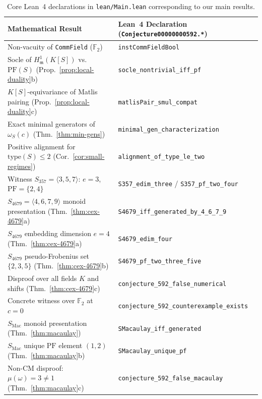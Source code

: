 \documentclass[11pt]{article}
\theoremstyle{definition}
\theoremstyle{remark}
\begin{document}
\begin{table}[ht]
\centering
\caption{Core Lean~4 declarations in \texttt{lean/Main.lean} corresponding to our main results.}
\label{tab:lean-map}
\vspace{4pt}
\small
\begin{tabular}{ll}
\hline
Mathematical Result & Lean~4 Declaration (\texttt{Conjecture00000000592.*}) \\
\hline
Non-vacuity of \texttt{CommField} ($\mathbb{F}_2$) & \texttt{instCommFieldBool} \\
Socle of $H^1_{\mathfrak{m}}(K[S])$ vs.\ $\mathrm{PF}(S)$ (Prop.~\ref{prop:local-duality}b) & \texttt{socle\_nontrivial\_iff\_pf} \\
$K[S]$-equivariance of Matlis pairing (Prop.~\ref{prop:local-duality}c) & \texttt{matlisPair\_smul\_compat} \\
Exact minimal generators of $\omega_S(c)$ (Thm.~\ref{thm:min-gens}) & \texttt{minimal\_gen\_characterization} \\
Positive alignment for $\mathrm{type}(S) \le 2$ (Cor.~\ref{cor:small-regimes}) & \texttt{alignment\_of\_type\_le\_two} \\
Witness $S_{357} = \langle 3, 5, 7 \rangle$: $e = 3$, $\mathrm{PF} = \{2, 4\}$ & \texttt{S357\_edim\_three} / \texttt{S357\_pf\_two\_four} \\
$S_{4679} = \langle 4, 6, 7, 9 \rangle$ monoid presentation (Thm.~\ref{thm:cex-4679}a) & \texttt{S4679\_iff\_generated\_by\_4\_6\_7\_9} \\
$S_{4679}$ embedding dimension $e = 4$ (Thm.~\ref{thm:cex-4679}a) & \texttt{S4679\_edim\_four} \\
$S_{4679}$ pseudo-Frobenius set $\{2, 3, 5\}$ (Thm.~\ref{thm:cex-4679}b) & \texttt{S4679\_pf\_two\_three\_five} \\
Disproof over all fields $K$ and shifts (Thm.~\ref{thm:cex-4679}c) & \texttt{conjecture\_592\_false\_numerical} \\
Concrete witness over $\mathbb{F}_2$ at $c = 0$ & \texttt{conjecture\_592\_counterexample\_exists} \\
$S_{\mathrm{Mac}}$ monoid presentation (Thm.~\ref{thm:macaulay}) & \texttt{SMacaulay\_iff\_generated} \\
$S_{\mathrm{Mac}}$ unique $\mathrm{PF}$ element $(1, 2)$ (Thm.~\ref{thm:macaulay}b) & \texttt{SMacaulay\_unique\_pf} \\
Non-CM disproof: $\mu(\omega) = 3 \ne 1$ (Thm.~\ref{thm:macaulay}c) & \texttt{conjecture\_592\_false\_macaulay} \\
\hline
\end{tabular}
\end{table}
\end{document}
